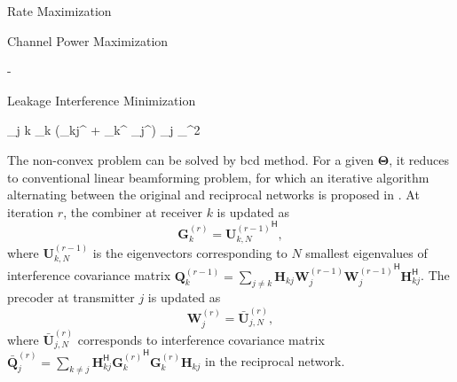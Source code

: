 \documentclass[journal]{IEEEtran}
\begin{document}
\begin{section}{Rate Maximization}
\begin{subsection}{Channel Power Maximization}

	\end{subsection}

\end{section}


\begin{section}{-}
	\begin{subsection}{Leakage Interference Minimization}
		\begin{mini!}
			{}{\mathop{\sum\sum}_{j \neq k} \left\lVert {}_k (_{kj}^ + _k^ \mathbf{\Theta} _j^) _j \right\rVert _{}^2}{}{}
		\end{mini!}
		The non-convex problem can be solved by \gls{bcd} method.
		For a given $\mathbf{\Theta}$, it reduces to conventional linear beamforming problem, for which an iterative algorithm alternating between the original and reciprocal networks is proposed in \cite{Gomadam2011,Clerckx2013}.
		At iteration $r$, the combiner at receiver $k$ is updated as
		\begin{equation}
			\mathbf{G}_k^{(r)} = {\mathbf{U}_{k,N}^{(r-1)}}^\mathsf{H},
		\end{equation}
		where $\mathbf{U}_{k,N}^{(r-1)}$ is the eigenvectors corresponding to $N$ smallest eigenvalues of interference covariance matrix $\mathbf{Q}_k^{(r-1)} = \sum_{j \ne k} \mathbf{H}_{kj} \mathbf{W}_j^{(r-1)} {\mathbf{W}_j^{(r-1)}}^\mathsf{H} \mathbf{H}_{kj}^\mathsf{H}$.
		The precoder at transmitter $j$ is updated as
		\begin{equation}
			\mathbf{W}_j^{(r)} = \bar{\mathbf{U}}_{j,N}^{(r)},
		\end{equation}
		where $\bar{\mathbf{U}}_{j,N}^{(r)}$ corresponds to interference covariance matrix $\bar{\mathbf{Q}}_j^{(r)} = \sum_{k \ne j} \mathbf{H}_{kj}^\mathsf{H} {\mathbf{G}_k^{(r)}}^\mathsf{H} \mathbf{G}_k^{(r)} \mathbf{H}_{kj}$ in the reciprocal network.

\end{subsection}
\end{section}
\end{document}
